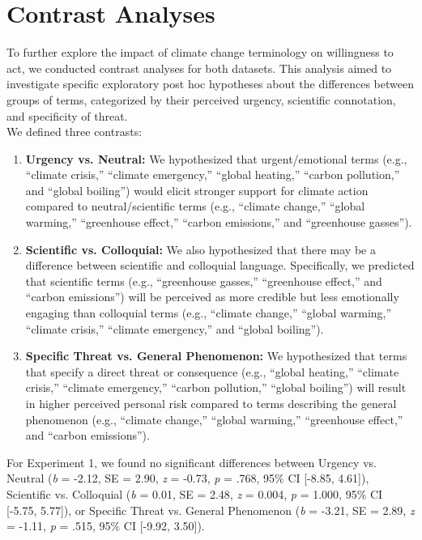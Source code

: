       \section{Contrast Analyses}
To further explore the impact of climate change terminology on willingness to act, we conducted contrast analyses for both datasets. This analysis aimed to investigate specific exploratory post hoc hypotheses about the differences between groups of terms, categorized by their perceived urgency, scientific connotation, and specificity of threat.\\

 We defined three contrasts:\\

\begin{enumerate}
    \item \textbf{Urgency vs. Neutral:} We hypothesized that urgent/emotional terms (e.g., “climate crisis,” “climate emergency,” “global heating,” “carbon pollution,” and “global boiling”) would elicit stronger support for climate action compared to neutral/scientific terms (e.g., “climate change,” “global warming,” “greenhouse effect,” “carbon emissions,” and “greenhouse gasses”).

    \item \textbf{Scientific vs. Colloquial:} We also hypothesized that there may be a difference between scientific and colloquial language. Specifically, we predicted that scientific terms (e.g., “greenhouse gasses,” “greenhouse effect,” and “carbon emissions”) will be perceived as more credible but less emotionally engaging than colloquial terms (e.g., “climate change,” “global warming,” “climate crisis,” “climate emergency,” and “global boiling”).

    \item \textbf{Specific Threat vs. General Phenomenon:} We hypothesized that terms that specify a direct threat or consequence (e.g., “global heating,” “climate crisis,” “climate emergency,” “carbon pollution,” “global boiling”) will result in higher perceived personal risk compared to terms describing the general phenomenon (e.g., “climate change,” “global warming,” “greenhouse effect,” and “carbon emissions”). 
\end{enumerate}

 For Experiment 1, we found no significant differences between Urgency vs. Neutral (\textit{b} = -2.12, SE = 2.90, \textit{z} = -0.73, \textit{p }= .768, 95\% CI [-8.85, 4.61]), Scientific vs. Colloquial (\textit{b} = 0.01, SE = 2.48, \textit{z} = 0.004, \textit{p} = 1.000, 95\% CI [-5.75, 5.77]), or Specific Threat vs. General Phenomenon (\textit{b} = -3.21, SE = 2.89, \textit{z} = -1.11, \textit{p} = .515, 95\% CI [-9.92, 3.50]). \\

